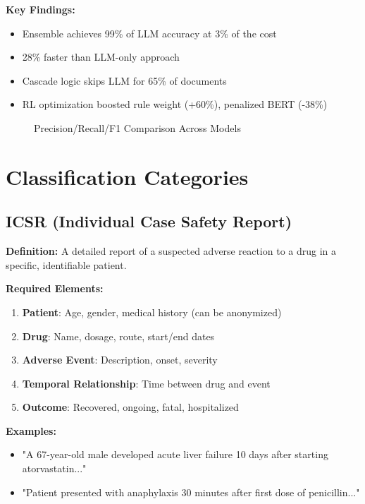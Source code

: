 \textbf{Key Findings:}
\begin{itemize}
    \item Ensemble achieves 99\% of LLM accuracy at 3\% of the cost
    \item 28\% faster than LLM-only approach
    \item Cascade logic skips LLM for 65\% of documents
    \item RL optimization boosted rule weight (+60\%), penalized BERT (-38\%)
\end{itemize}

\begin{figure}[h]
\centering
{}
\caption{Precision/Recall/F1 Comparison Across Models}
\label{fig:model-performance-comparison}
\end{figure}

\section{Classification Categories}

\subsection{ICSR (Individual Case Safety Report)}

\textbf{Definition:}
A detailed report of a suspected adverse reaction to a drug in a specific, identifiable patient.

\textbf{Required Elements:}
\begin{enumerate}
    \item \textbf{Patient}: Age, gender, medical history (can be anonymized)
    \item \textbf{Drug}: Name, dosage, route, start/end dates
    \item \textbf{Adverse Event}: Description, onset, severity
    \item \textbf{Temporal Relationship}: Time between drug and event
    \item \textbf{Outcome}: Recovered, ongoing, fatal, hospitalized
\end{enumerate}

\textbf{Examples:}
\begin{itemize}
    \item "A 67-year-old male developed acute liver failure 10 days after starting atorvastatin..."
    \item "Patient presented with anaphylaxis 30 minutes after first dose of penicillin..."
\end{itemize}

